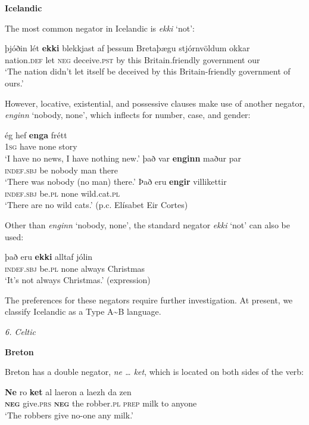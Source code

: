 ﻿\documentclass[output=paper]{langsci/langscibook}
\begin{document}
\begin{unindented}
\textbf{Icelandic}

The most common negator in Icelandic is \textit{ekki} `not': 
%
\begin{exe}\ex \gll þjóðin lét   \textbf{ekki}   blekkjast   af   þessum 
Bretaþægu stjórnvöldum   okkar \\
nation.\textsc{def} let \textsc{neg} deceive.\textsc{pst} by this   
Britain.friendly   government our \\
    \glt `The nation didn't let itself be deceived by this Britain-friendly government of ours.' \citep[286]{Wood2012}
    \end{exe}

However, locative, existential, and possessive clauses make use of another negator, \textit{enginn} `nobody, none', which inflects for number, case, and gender: 
%
\begin{exe}\ex \gll ég   hef    \textbf{enga} frétt \\
\textsc{1sg} have none story \\
    \glt `I have no news, I have nothing new.' \citep[62]{Bjarnason1998}
\ex \gll það var \textbf{enginn}  maður par \\
\textsc{indef.sbj} be   nobody man    there \\
    \glt `There was nobody (no man) there.' \citet[123]{Einarsson1949} 
\ex \gll Það eru    \textbf{engir} villikettir \\
\textsc{indef.sbj} be.\textsc{pl} none   wild.cat.\textsc{pl} \\
    \glt `There are no wild cats.' (p.c. Elísabet Eir Cortes)
    \end{exe}

Other than \textit{enginn} `nobody, none', the standard negator \textit{ekki} `not' can also be used:
%
\begin{exe}\ex \gll það eru \textbf{ekki} alltaf    jólin \\
\textsc{indef.sbj} be.\textsc{pl} none always Christmas \\
    \glt `It's not always Christmas.' (expression)
    \end{exe}

The preferences for these negators require further investigation.  At present, we classify Icelandic as a Type A{\textasciitilde}B language. 

\textit{6. Celtic}

\textbf{Breton}

Breton has a double negator, \textit{ne … ket}, which is located on both sides of the verb:
%
\begin{exe}\ex \gll \textbf{Ne} ro \textbf{ket}   al  laeron a laezh da zen \\
\textbf{\textsc{neg}} give.\textsc{prs} \textbf{\textsc{neg}} the robber.\textsc{pl} \textsc{prep} milk   to anyone \\
    \glt `The robbers give no-one any milk.' \citet[126]{Press1986}
    \end{exe}


\end{unindented}
\end{document}
